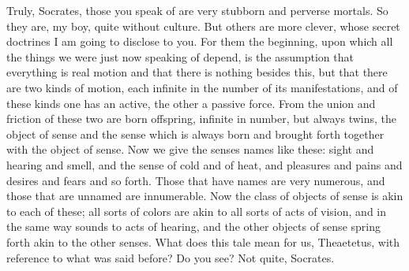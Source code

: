 \documentclass[letterpaper,12pt]{article}
\newcommand{\stephpag}[1]{\marginnote{\small\itshape\fontfamily{ppl}\selectfont #1}}
\begin{document}
\begin{drama}
\theaetetusspeaks
Truly, Socrates, those you speak of are very stubborn \stephpag{156 a} and perverse mortals.
\socratesspeaks
So they are, my boy, quite without culture. But others are more clever, whose secret doctrines I am going to disclose to you. For them the beginning, upon which all the things we were just now speaking of depend, is the assumption that everything is real motion and that there is nothing besides this, but that there are two kinds of motion, each infinite in the number of its manifestations, and of these kinds one has an active, the other a passive force. From the union and friction of these two are born offspring, infinite in number, but always twins, the object of sense \stephpag{b} and the sense which is always born and brought forth together with the object of sense. Now we give the senses names like these: sight and hearing and smell, and the sense of cold and of heat, and pleasures and pains and desires and fears and so forth. Those that have names are very numerous, and those that are unnamed are innumerable. Now the class of objects of sense is akin to each of these; all sorts of colors are akin to all sorts of acts of vision, and in the same way sounds to acts of hearing, \stephpag{c} and the other objects of sense spring forth akin to the other senses. What does this tale mean for us, Theaetetus, with reference to what was said before? Do you see?
\theaetetusspeaks
Not quite, Socrates.
\socratesspeaks

\end{drama}
\end{document}
